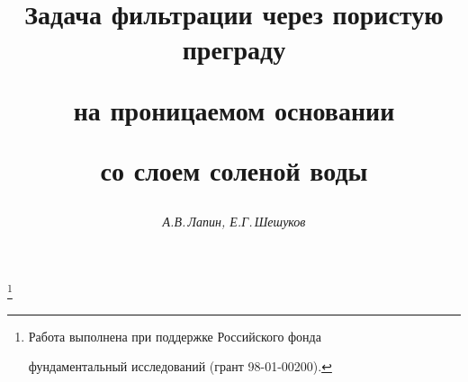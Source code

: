 




% 





\newcommand{\loc}{\operatorname{loc}}


\newcommand{\grad}{\operatorname{grad}}


\newcommand{\Int}{\operatorname{int}}


\newcommand{\Div}{\operatorname{div}}


\newcommand{\mes}{\operatorname{mes}}


\newcommand{\tts}[1]{}







\setcounter{page}{9}















\author{\it А.В.\,Лапин, Е.Г.\,Шешуков }




\title{Задача фильтрации через пористую преграду


на проницаемом основании


со слоем соленой воды}


\thanks{Работа выполнена при поддержке Российского фонда


фундаментальный исследований (грант 98-01-00200).}





\date{}




